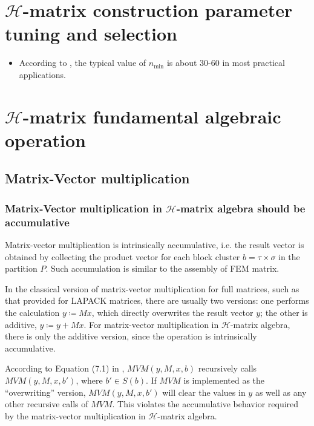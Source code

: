 \documentclass[11pt, a4paper]{book}
\begin{document}
\section{$\mathcal{H}$-matrix construction parameter tuning and selection}

\begin{itemize}
\item According to \cite{KriemannParallel2005a}, the typical value of $n_{\min}$ is about
  30-60 in most practical applications.
\end{itemize}

\section{$\mathcal{H}$-matrix fundamental algebraic operation}

\subsection{Matrix-Vector multiplication}
\label{sec:hmat-vmult}

\subsubsection{Matrix-Vector multiplication in $\mathcal{H}$-matrix algebra should be accumulative}

Matrix-vector multiplication is intrinsically accumulative, i.e. the result vector is obtained by
collecting the product vector for each block cluster $b=\tau\times\sigma$ in the partition $P$. Such
accumulation is similar to the assembly of FEM matrix.

In the classical version of matrix-vector multiplication for full matrices, such as that provided
for LAPACK matrices, there are usually two versions: one performs the calculation $y \coloneqq Mx$,
which directly overwrites the result vector $y$; the other is additive, $y \coloneqq y + Mx$. For
matrix-vector multiplication in $\mathcal{H}$-matrix algebra, there is only the additive version,
since the operation is intrinsically accumulative.

According to Equation (7.1) in \cite{HackbuschHierarchical2015}, $MVM(y, M, x, b)$
recursively calls $MVM(y, M, x, b')$, where $b'\in S(b)$. If $MVM$ is implemented as the
``overwriting'' version, $MVM(y, M, x, b')$ will clear the values in $y$ as well as any other
recursive calls of $MVM$. This violates the accumulative behavior required by the matrix-vector
multiplication in $\mathcal{H}$-matrix algebra.
\end{document}
